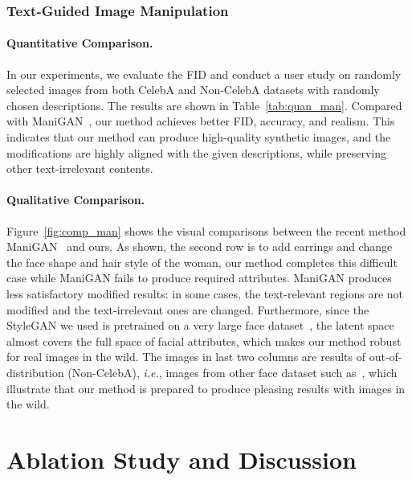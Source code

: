 \documentclass[final]{cvpr}
\def\ie{\emph{i.e.}}
\begin{document}
\vspace{-5pt}
\subsubsection{Text-Guided Image Manipulation}
\label{subsec:exp_man}

\vspace{-5pt}
\paragraph{Quantitative Comparison.}
In our experiments, we evaluate the FID and conduct a user study on randomly selected images from both CelebA and Non-CelebA datasets with randomly chosen descriptions. 
The results are shown in Table~\ref{tab:quan_man}. Compared with ManiGAN~\cite{li2020manigan}, our method achieves better FID, accuracy, and realism. 
This indicates that our method can produce high-quality synthetic images, and the modifications are highly aligned with the given descriptions, while preserving other text-irrelevant contents. 

\vspace{-5pt}
\paragraph{Qualitative Comparison.} 
Figure~\ref{fig:comp_man} shows the visual comparisons between the recent method ManiGAN~\cite{li2020manigan} and ours.
As shown, the second row is to add earrings and change the face shape and hair style of the woman, our method completes this difficult case while ManiGAN fails to produce required attributes.
ManiGAN produces less satisfactory modified results: in some cases, the text-relevant regions are not modified and the text-irrelevant ones are changed.
Furthermore, since the StyleGAN we used is pretrained on a very large face dataset~\cite{karras2019style}, the latent space almost covers the full space of facial attributes, which makes our method robust for real images in the wild. 
The images in last two columns are results of out-of-distribution (Non-CelebA), \ie, images from other face dataset such as~\cite{chelnokova2014rewards, courset2018caucasian, yi2019apdrawinggan}, which illustrate that our method is prepared to produce pleasing results with images in the wild.

\section{Ablation Study and Discussion}
\label{sec:ablation}
\end{document}
